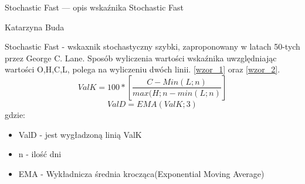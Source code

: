 \documentclass[12pt,a4paper]{article}
\begin{document}
\begin{center}
\begin{large}
Stochastic Fast --- opis wskaźnika Stochastic Fast\\
\end{large}
Katarzyna Buda
\end{center}

Stochastic Fast - wskaxnik stochastyczny szybki, zaproponowany w latach 50-tych przez George C. Lane. Sposób wyliczenia wartości wskaźnika uwzględniając wartości O,H,C,L, polega na wyliczeniu dwóch linii. \ref{wzor_1} oraz \ref{wzor_2}.
\begin{equation}
ValK=100*[ \frac{C-Min(L;n)}{max(H;n - min(L;n)}]
\label{wzor_1}
\end{equation}
\begin{equation}
ValD=EMA(ValK;3)
\label{wzor_2}
\end{equation}
gdzie:
\begin{itemize}
\newline
\item ValD - jest wygładzoną linią ValK
\item n - ilość dni
\item EMA - Wykładnicza średnia krocząca(Exponential Moving Average)
\end{itemize}
\end{document}
